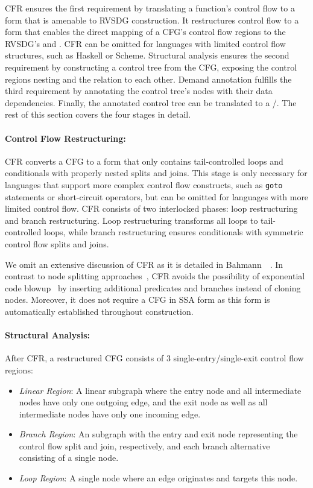 CFR ensures the first requirement by translating a function's control flow to a form that is
amenable to RVSDG construction. It restructures control flow to a form that enables the direct
mapping of a CFG's control flow regions to the RVSDG's \gammam and \thetanodes. CFR can be omitted
for languages with limited control flow structures, such as Haskell or Scheme. Structural analysis
ensures the second requirement by constructing a control tree from the CFG, exposing the control
regions nesting and the relation to each other. Demand annotation fulfills the third requirement
by annotating the control tree's nodes with their data dependencies. Finally, the annotated control
tree can be translated to a \deltam/\lambdaregion. The rest of this section covers the four stages
in detail.

\paragraph{Control Flow Restructuring:}
CFR converts a CFG to a form that only contains tail-controlled loops and conditionals with
properly nested splits and joins. This stage is only necessary for languages that support more
complex control flow constructs, such as \verb;goto; statements or short-circuit operators, but
can be omitted for languages with more limited control flow. CFR consists of two interlocked
phases: loop restructuring and branch restructuring. Loop restructuring transforms all loops to
tail-controlled loops, while branch restructuring ensures conditionals with symmetric control flow
splits and joins.

We omit an extensive discussion of CFR as it is detailed in Bahmann~\etal~\cite{Bahmann15}.
In contrast to node splitting approaches~\cite{Zhang04}, CFR avoids the possibility of exponential
code blowup~\cite{Carter03} by inserting additional predicates and branches instead of cloning
nodes. Moreover, it does not require a CFG in SSA form as this form is automatically established
throughout construction.


\paragraph{Structural Analysis:}
After CFR, a restructured CFG consists of 3 single-entry/single-exit control flow regions:

\begin{itemize}
	\item \textit{Linear Region}: A linear subgraph where the entry node and all intermediate nodes
		have only one outgoing edge, and the exit node as well as all intermediate nodes have only one
		incoming edge.

	\item \textit{Branch Region}: An subgraph with the entry and exit node representing the
		control flow split and join, respectively, and each branch alternative consisting of a single
		node.

	\item \textit{Loop Region}: A single node where an edge originates and targets this node.
\end{itemize}

